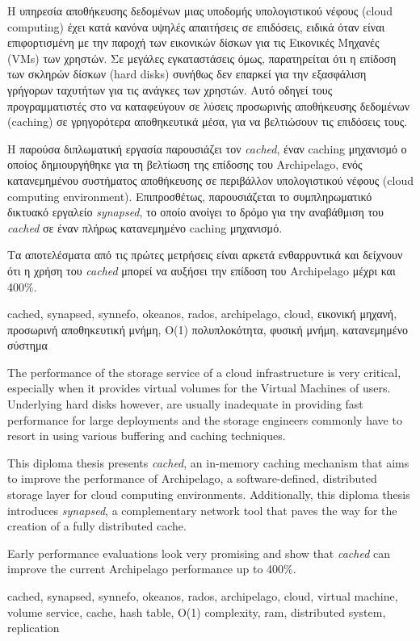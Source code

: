 \begin{abstractgr}
	Η υπηρεσία αποθήκευσης δεδομένων μιας υποδομής υπολογιστικού νέφους 
	(cloud computing) έχει κατά κανόνα υψηλές απαιτήσεις σε επιδόσεις, 
	ειδικά όταν είναι επιφορτισμένη με την παροχή των εικονικών δίσκων για 
	τις Εικονικές Μηχανές (VMs) των χρηστών. Σε μεγάλες εγκαταστάσεις όμως, 
	παρατηρείται ότι η επίδοση των σκληρών δίσκων (hard disks) συνήθως δεν 
	επαρκεί για την εξασφάλιση γρήγορων ταχυτήτων για τις ανάγκες των 
	χρηστών. Αυτό οδηγεί τους προγραμματιστές στο να καταφεύγουν σε λύσεις 
	προσωρινής αποθήκευσης δεδομένων (caching) σε γρηγορότερα αποθηκευτικά 
	μέσα, για να βελτιώσουν τις επιδόσεις τους.
	
	Η παρούσα διπλωματική εργασία παρουσιάζει τον \textit{cached}, έναν 
	caching μηχανισμό ο οποίος δημιουργήθηκε για τη βελτίωση της επίδοσης 
	του Archipelago, ενός κατανεμημένου συστήματος αποθήκευσης σε 
	περιβάλλον υπολογιστικού νέφους (cloud computing environment).	
	Επιπροσθέτως, παρουσιάζεται το συμπληρωματικό δικτυακό εργαλείο 
	\textit{synapsed}, το οποίο ανοίγει το δρόμο για την αναβάθμιση του 
	\textit{cached} σε έναν πλήρως κατανεμημένο caching μηχανισμό.
	
	Τα αποτελέσματα από τις πρώτες μετρήσεις είναι αρκετά ενθαρρυντικά και 
	δείχνουν ότι η χρήση του \textit{cached} μπορεί να αυξήσει την επίδοση του 
	Archipelago μέχρι και 400\%.
	\begin{keywordsgr}
		cached, synapsed, synnefo, okeanos, rados, archipelago, cloud, εικονική 
		μηχανή, προσωρινή αποθηκευτική μνήμη, Ο(1) πολυπλοκότητα, φυσική μνήμη, 
		κατανεμημένο σύστημα
		\end{keywordsgr}
\end{abstractgr}

\begin{abstracten}
	The performance of the storage service of a cloud infrastructure is very 
	critical, especially when it provides virtual volumes for the Virtual
	Machines of users. Underlying hard disks however, are usually inadequate in 
	providing fast performance for large deployments and the storage engineers 
	commonly have to resort in using various buffering and caching techniques.
	
	This diploma thesis presents \textit{cached}, an in-memory caching 
	mechanism that aims to improve the performance of Archipelago, a 
	software-defined, distributed storage layer for cloud computing 
	environments.  Additionally, this diploma thesis introduces 
	\textit{synapsed}, a complementary network tool that paves the way for 
	the creation of a fully distributed cache.
	
	Early performance evaluations look very promising and show that 
	\textit{cached} can improve the current Archipelago performance up to 
	400\%.
	\begin{keywordsen}
		cached, synapsed, synnefo, okeanos, rados, archipelago, cloud, 
		virtual machine, volume service, cache, hash table,  O(1) 
		complexity, ram, distributed system, replication
	\end{keywordsen}
\end{abstracten}

\begin{acknowledgementsgr}
	\todo
\end{acknowledgementsgr}
